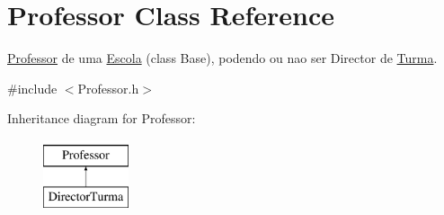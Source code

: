 \hypertarget{class_professor}{\section{Professor Class Reference}
\label{class_professor}
}


\hyperlink{class_professor}{Professor} de uma \hyperlink{class_escola}{Escola} (class Base), podendo ou nao ser Director de \hyperlink{class_turma}{Turma}.  




{\ttfamily \#include $<$Professor.\-h$>$}

Inheritance diagram for Professor\-:\begin{figure}[H]
\begin{center}
\leavevmode
\includegraphics[height=2.000000cm]{class_professor}
\end{center}
\end{figure}
